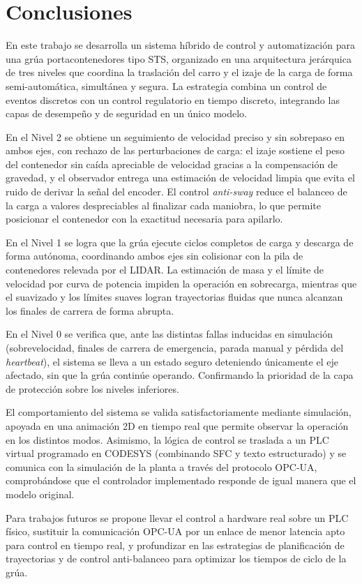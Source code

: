 \newpage
\section{Conclusiones}

En este trabajo se desarrolla un sistema híbrido de control y automatización para una grúa
portacontenedores tipo STS, organizado en una arquitectura jerárquica de tres niveles que
coordina la traslación del carro y el izaje de la carga de forma semi-automática, simultánea y
segura. La estrategia combina un control de eventos discretos con un control regulatorio en
tiempo discreto, integrando las capas de desempeño y de seguridad en un único modelo.

En el Nivel 2 se obtiene un seguimiento de velocidad preciso y sin sobrepaso en ambos ejes, con
rechazo de las perturbaciones de carga: el izaje sostiene el peso del contenedor sin caída
apreciable de velocidad gracias a la compensación de gravedad, y el observador entrega una
estimación de velocidad limpia que evita el ruido de derivar la señal del encoder. El control
\textit{anti-sway} reduce el balanceo de la carga a valores despreciables al finalizar cada
maniobra, lo que permite posicionar el contenedor con la exactitud necesaria para apilarlo.

En el Nivel 1 se logra que la grúa ejecute ciclos completos de carga y descarga de forma
autónoma, coordinando ambos ejes sin colisionar con la pila de contenedores relevada por el
LIDAR. La estimación de masa y el límite de velocidad por curva de potencia impiden la operación
en sobrecarga, mientras que el suavizado y los límites suaves logran trayectorias fluidas que
nunca alcanzan los finales de carrera de forma abrupta.

En el Nivel 0 se verifica que, ante las distintas fallas inducidas en simulación (sobrevelocidad,
finales de carrera de emergencia, parada manual y pérdida del \textit{heartbeat}), el sistema se
lleva a un estado seguro deteniendo únicamente el eje afectado, sin que la grúa continúe operando.
Confirmando la prioridad de la capa de protección sobre los niveles inferiores.

El comportamiento del sistema se valida satisfactoriamente mediante simulación, apoyada en una
animación 2D en tiempo real que permite observar la operación en los distintos modos. Asimismo, la
lógica de control se traslada a un PLC virtual programado en CODESYS (combinando SFC y texto
estructurado) y se comunica con la simulación de la planta a través del protocolo OPC-UA,
comprobándose que el controlador implementado responde de igual manera que el modelo original.

Para trabajos futuros se propone llevar el control a hardware real sobre un PLC físico, sustituir
la comunicación OPC-UA por un enlace de menor latencia apto para control en tiempo real, y
profundizar en las estrategias de planificación de trayectorias y de control anti-balanceo para
optimizar los tiempos de ciclo de la grúa.

